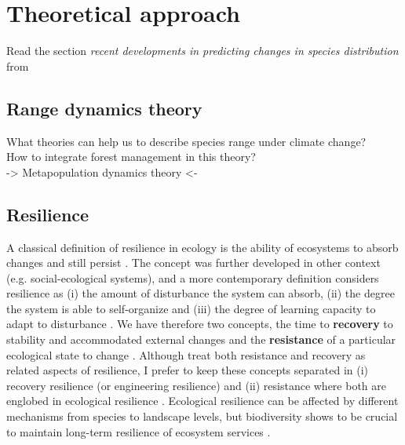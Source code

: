 

\section{Theoretical approach}\label{ta}

Read the section \textit{recent developments in predicting changes in species distribution} from \textcite{Ehrlen2015}

\subsection{Range dynamics theory}

What theories can help us to describe species range under climate change?\\
How to integrate forest management in this theory?\\
-> Metapopulation dynamics theory <-

\subsection{Resilience}\label{res}

A classical definition of resilience in ecology is the ability of ecosystems to absorb changes and still persist \parencite{Holling1973}.
The concept was further developed in other context (e.g. social-ecological systems), and a more contemporary definition considers resilience as (i) the amount of disturbance the system can absorb, (ii) the degree the system is able to self-organize and (iii) the degree of learning capacity to adapt to disturbance \parencite{Cumming2011}.
We have therefore two concepts, the time to \textbf{recovery} to stability and accommodated external changes \parencite{pimm1984,Folke2002} and the \textbf{resistance} of a particular ecological state to change \parencite{Peterson1998}.
Although \textcite{Oliver2015} treat both resistance and recovery as related aspects of resilience, I prefer to keep these concepts separated in (i) recovery resilience (or engineering resilience) and (ii) resistance where both are englobed in ecological resilience \parencite{Hodgson2015,Nimmo2015}.
Ecological resilience can be affected by different mechanisms from species to landscape levels, but biodiversity shows to be crucial to maintain long-term resilience of ecosystem services \parencite{Oliver2015}.

